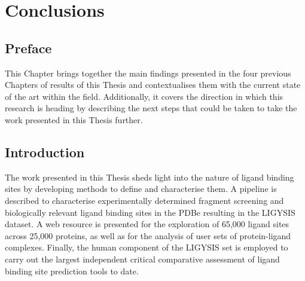 \chapter{Conclusions}

\section*{Preface}

This Chapter brings together the main findings presented in the four previous Chapters of results of this Thesis and contextualises them with the current state of the art within the field. Additionally, it covers the direction in which this research is heading by describing the next steps that could be taken to take the work presented in this Thesis further.

\section{Introduction}


The work presented in this Thesis sheds light into the nature of ligand binding sites by developing methods to define and characterise them. A pipeline is described to characterise experimentally determined fragment screening and biologically relevant ligand binding sites in the PDBe resulting in the LIGYSIS dataset. A web resource is presented for the exploration of 65,000 ligand sites across 25,000 proteins, as well as for the analysis of user sets of protein-ligand complexes. Finally, the human component of the LIGYSIS set is employed to carry out the largest independent critical comparative assessment of ligand binding site prediction tools to date.

